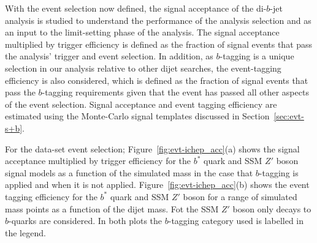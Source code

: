 With the event selection now defined,
the signal acceptance of the di-$b$-jet analysis is studied
to understand the performance of the analysis selection
and as an input to the limit-setting phase of the analysis.
The signal acceptance multiplied by trigger efficiency is defined as the 
fraction of signal events that pass the analysis' trigger and event selection.
In addition, as $b$-tagging is a unique selection in our analysis relative to other dijet searches,
the event-tagging efficiency is also considered, which is defined as the fraction of signal events that pass
the $b$-tagging requirements given that the event has passed all other aspects of the event selection.
Signal acceptance and event tagging efficiency are estimated using the
Monte-Carlo signal templates discussed in Section~\ref{sec:evt-s+b}.

For the \summer{} data-set event selection;
Figure~\ref{fig:evt-ichep_acc}(a) shows the signal acceptance multiplied by trigger efficiency
for the $b^*$ quark and SSM $Z'$ boson signal models
as a function of the simulated mass
in the case that $b$-tagging is applied and when it is not applied.
Figure~\ref{fig:evt-ichep_acc}(b) shows the event tagging efficiency
for the $b^*$ quark and SSM $Z'$ boson for a range of simulated mass points
as a function of the dijet mass.
Fot the SSM $Z'$ boson only decays to $b$-quarks are considered.
In both plots the $b$-tagging category used is labelled in the legend.

